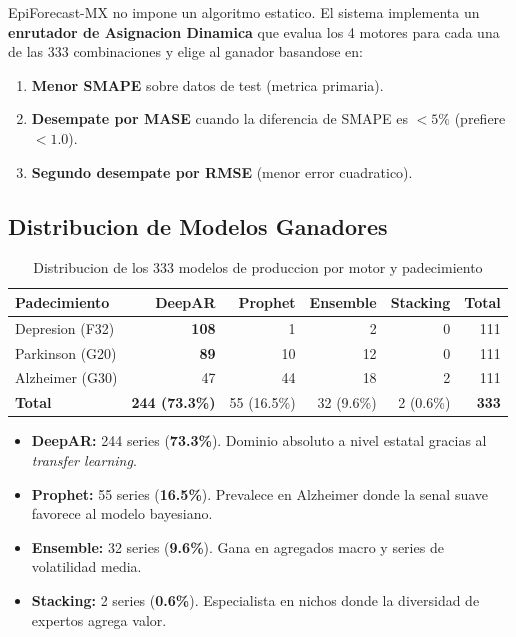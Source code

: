 \documentclass[12pt, letterpaper]{article}
\begin{document}
EpiForecast-MX no impone un algoritmo estatico. El sistema implementa un \textbf{enrutador de Asignacion Dinamica} que evalua los 4 motores para cada una de las 333 combinaciones y elige al ganador basandose en:

\begin{enumerate}[noitemsep]
    \item \textbf{Menor SMAPE} sobre datos de test (metrica primaria).
    \item \textbf{Desempate por MASE} cuando la diferencia de SMAPE es $<5\%$ (prefiere $<1.0$).
    \item \textbf{Segundo desempate por RMSE} (menor error cuadratico).
\end{enumerate}

\subsection{Distribucion de Modelos Ganadores}

\begin{table}[H]
\centering
\caption{Distribucion de los 333 modelos de produccion por motor y padecimiento}
\label{tab:dist_prod}
\small
\begin{tabular}{l rrrr r}
\toprule
\textbf{Padecimiento} & \textbf{DeepAR} & \textbf{Prophet} & \textbf{Ensemble} & \textbf{Stacking} & \textbf{Total} \\
\midrule
\rowcolor{cdeepar!8}
Depresion (F32)  & \textbf{108} & 1  & 2  & 0 & 111 \\
Parkinson (G20)  & \textbf{89}  & 10 & 12 & 0 & 111 \\
Alzheimer (G30)  & 47           & 44 & 18 & 2 & 111 \\
\midrule
\textbf{Total}   & \textbf{244 (73.3\%)} & 55 (16.5\%) & 32 (9.6\%) & 2 (0.6\%) & \textbf{333} \\
\bottomrule
\end{tabular}
\end{table}

\begin{itemize}[noitemsep]
    \item \textcolor{cdeepar}{\textbf{DeepAR:}} 244 series (\textbf{73.3\%}). Dominio absoluto a nivel estatal gracias al \textit{transfer learning}.
    \item \textcolor{cprophet}{\textbf{Prophet:}} 55 series (\textbf{16.5\%}). Prevalece en Alzheimer donde la senal suave favorece al modelo bayesiano.
    \item \textcolor{censemble}{\textbf{Ensemble:}} 32 series (\textbf{9.6\%}). Gana en agregados macro y series de volatilidad media.
    \item \textcolor{cstacking}{\textbf{Stacking:}} 2 series (\textbf{0.6\%}). Especialista en nichos donde la diversidad de expertos agrega valor.
\end{itemize}
\end{document}
